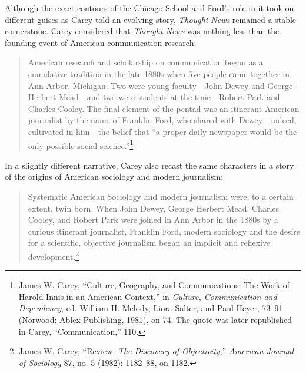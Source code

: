 \documentclass[openany,nobib]{tufte-book}
\begin{document}
Although the exact contours of the Chicago School and Ford's role in it
took on different guises as Carey told an evolving story, \emph{Thought
News} remained a stable cornerstone. Carey considered that \emph{Thought
News} was nothing less than the founding event of American communication
research:

\begin{quote}
American research and scholarship on communication began as a cumulative
tradition in the late 1880s when five people came together in Ann Arbor,
Michigan. Two were young faculty---John Dewey and George Herbert
Mead---and two were students at the time---Robert Park and Charles
Cooley. The final element of the pentad was an itinerant American
journalist by the name of Franklin Ford, who shared with Dewey---indeed,
cultivated in him---the belief that ``a proper daily newspaper would be
the only possible social science.''\footnote{James W. Carey, ``Culture,
  Geography, and Communications: The Work of Harold Innis in an American
  Context,'' in \emph{Culture, Communication and Dependency}, ed.
  William H. Melody, Liora Salter, and Paul Heyer, 73--91 (Norwood:
  Ablex Publishing, 1981), on 74. The quote was later republished in
  Carey, ``Communication,'' 110.}
\end{quote}

\noindent In a slightly different narrative, Carey also recast the same characters
in a story of the origins of American sociology and modern journalism:

\begin{quote}
Systematic American Sociology and modern journalism were, to a certain
extent, twin born. When John Dewey, George Herbert Mead, Charles Cooley,
and Robert Park were joined in Ann Arbor in the 1880s by a curious
itinerant journalist, Franklin Ford, modern sociology and the desire for
a scientific, objective journalism began an implicit and reflexive
development.\footnote{James W. Carey, ``Review: \emph{The Discovery of
  Objectivity},'' \emph{American Journal of Sociology} 87, no. 5 (1982):
  1182--88, on 1182.}
\end{quote}
\end{document}
